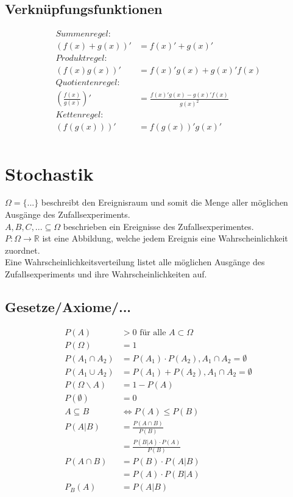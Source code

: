 \documentclass[a4paper, landscape, 10pt]{article}
\begin{document}
\begin{multicols}{5}
\begin{small}
		\subsection{Verknüpfungsfunktionen}
			\begin{align*}
			Summenregel:\\ (f(x) + g(x))' &= f(x)' + g(x)'  \\ 
			Produktregel:\\ (f(x)g(x))' &= f(x)'g(x)+g(x)'f(x)  \\
			Quotientenregel:\\ (\frac{f(x)}{g(x)})' &= \frac{f(x)'g(x)-g(x)'f(x)}{g(x)^2} \\
			Kettenregel:\\ (f(g(x)))' &= f(g(x))'g(x)' \\
			\end{align*}
    \section{Stochastik}
    	$\Omega = \{ ... \}$ beschreibt den Ereignisraum und somit die Menge aller möglichen Ausgänge des Zufallsexperiments.\\
    	$A, B, C, ... \subseteq \Omega$ beschrieben ein Ereignisse des Zufallsexperimentes.\\
    	$P: \Omega \rightarrow \mathbb{R}$ ist eine Abbildung, welche jedem Ereignis eine Wahrscheinlichkeit zuordnet.\\
    	Eine Wahrscheinlichkeitsverteilung listet alle möglichen Ausgänge des Zufallsexperiments und ihre Wahrscheinlichkeiten auf.
    	\subsection{Gesetze/Axiome/...}
	    	\begin{align*}
	    	P(A) &> 0 \text{ für alle } A \subset \Omega\\
	    	P(\Omega) &= 1\\
	    	P(A_1 \cap A_2) &= P(A_1) \cdot P(A_2), A_1 \cap A_2 = \emptyset \\
	    	P(A_1 \cup A_2) &= P(A_1) + P(A_2), A_1 \cap A_2 = \emptyset \\
	    	P(\Omega \backslash A) &= 1 - P(A)\\
	    	P(\emptyset) &= 0\\
	    	A \subseteq B &\iff P(A) \leq P(B) \\
	    	P(A|B) &= \frac{P(A \cap B)}{P(B)} \\
	    	&= \frac{P(B|A)\cdot P(A)}{P(B)} \\
	    	P(A\cap B) &= P(B) \cdot P(A|B)\\
	    	&= P(A) \cdot P(B|A)\\
	    	P_B(A) &= P(A|B)
	    	\end{align*}
	    

\end{small}
\end{multicols}
\end{document}
